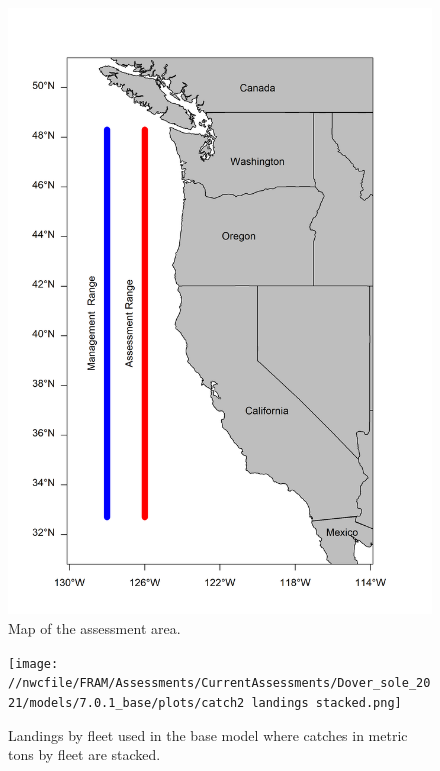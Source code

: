 \documentclass[11pt,
  english,
  a4paper,
]{article}
\begin{document}
\begin{figure}
\centering
\includegraphics[width=1\textwidth,height=1\textheight]{figs/map.png}
\caption{Map of the assessment area.\label{fig:map}}
\end{figure}

\tagmcend\tagstructend


\begin{figure}
\centering
\texttt{[image: //nwcfile/FRAM/Assessments/CurrentAssessments/Dover\_sole\_2021/models/7.0.1\_base/plots/catch2 landings stacked.png]}
\caption{Landings by fleet used in the base model where catches in metric tons by fleet are stacked.\label{fig:catch}}
\end{figure}
\end{document}
